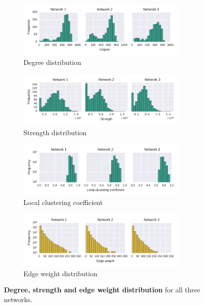 \begin{figure}[!t]
	\centering
	\begin{subfigure}[b]{1.0\textwidth}
	\centering
	\includegraphics[width=0.92\textwidth]{Figures/stat-degreeDist}
	\caption[Degree distribution]{Degree distribution}
	\label{fig:statDegreeDist}
	\end{subfigure} 
	\begin{subfigure}[b]{1.0\textwidth}
	\centering
	\includegraphics[width=0.92\textwidth]{Figures/stat-strengthDist}
	\caption[Strength distribution]{Strength distribution}
	\label{fig:statStrengthDist}
	\end{subfigure}
	\begin{subfigure}[b]{1.0\textwidth}
	\centering
	\includegraphics[width=0.92\textwidth]{Figures/stat-lccDist}
	\caption[Local clustering coefficient]{Local clustering coefficient}
	\label{fig:statlccDist}
	\end{subfigure}
	\begin{subfigure}[b]{1.0\textwidth}
	\centering
	\includegraphics[width=0.92\textwidth]{Figures/stat-edgeWeightDist}
	\caption[Edge weight distribution]{Edge weight distribution}
	\label{fig:statEdgeWeightDist}
	\end{subfigure}
	\caption[Degree, strength and edge weight distribution]{\textbf{Degree, strength and edge weight distribution} for all three networks.}
	\label{fig:distributions}
\end{figure}

